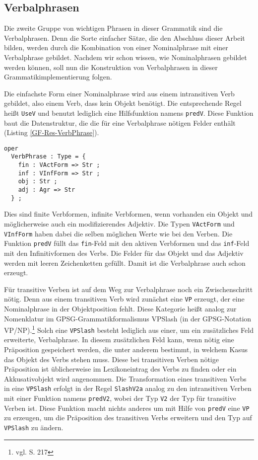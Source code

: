 \subsection{Verbalphrasen}
\label{subsec:verbalphrasen}
Die zweite Gruppe von wichtigen Phrasen in dieser Grammatik sind die Verbalphrasen. Denn die Sorte einfacher Sätze, die den Abschluss dieser Arbeit bilden, werden durch die Kombination von einer Nominalphrase mit einer Verbalphrase gebildet. Nachdem wir schon wissen, wie Nominalphrasen gebildet werden können, soll nun die Konstruktion von Verbalphrasen in dieser Grammatikimplementierung folgen. \par
Die einfachste Form einer Nominalphrase wird aus einem intransitiven Verb gebildet, also einem Verb, dass kein Objekt benötigt. Die entsprechende Regel heißt \texttt{UseV} und benutzt lediglich eine Hilfsfunktion namens \texttt{predV}. Diese Funktion baut die Datenstruktur, die die für eine Verbalphrase nötigen Felder enthält (Listing \ref{GF-Res-VerbPhrase}). 
\begin{lstlisting}[float=h!tp,caption={Datenstruktur für Verbalphrasen (vgl. \textbf{ResLat.gf})},label={GF-Res-VerbPhrase}]
oper
  VerbPhrase : Type = {
    fin : VActForm => Str ;
    inf : VInfForm => Str ;
    obj : Str ;
    adj : Agr => Str
  } ;
\end{lstlisting}
Dies sind finite Verbformen, infinite Verbformen, wenn vorhanden ein Objekt und möglicherweise auch ein modifizierendes Adjektiv. Die Typen \texttt{VActForm} und \texttt{VInfForm} haben dabei die selben möglichen Werte wie bei den Verben. Die Funktion \texttt{predV} füllt das \texttt{fin}-Feld mit den aktiven Verbformen und das \texttt{inf}-Feld mit den Infinitivformen des Verbs. Die Felder für das Objekt und das Adjektiv werden mit leeren Zeichenketten gefüllt. Damit ist die Verbalphrase auch schon erzeugt. \par
Für transitive Verben ist auf dem Weg zur Verbalphrase noch ein Zwischenschritt nötig. Denn aus einem transitiven Verb wird zunächst eine \texttt{VP} erzeugt, der eine Nominalphrase in der Objektposition fehlt. Diese Kategorie heißt analog zur Nomenklatur im GPSG-Grammatikformalismus VPSlash (in der GPSG-Notation VP/NP).\footnote{vgl. \cite{RANTA2011} S. 217} Solch eine \texttt{VPSlash} besteht lediglich aus einer, um ein zusätzliches Feld erweiterte, Verbalphrase. In diesem zusätzlichen Feld kann, wenn nötig eine Präposition gespeichert werden, die unter anderem bestimmt, in welchem Kasus das Objekt des Verbs stehen muss. Diese bei transitiven Verben nötige Präposition ist üblicherweise im Lexikoneintrag des Verbs zu finden oder ein Akkusativobjekt wird angenommen. Die Transformation eines transitiven Verbs in eine \texttt{VPSlash} erfolgt in der Regel \texttt{SlashV2a} analog zu den intransitiven Verben mit einer Funktion namens \texttt{predV2}, wobei der Typ \texttt{V2} der Typ für transitive Verben ist. Diese Funktion macht nichts anderes um mit Hilfe von \texttt{predV} eine \texttt{VP} zu erzeugen, um die Präposition des transitiven Verbs erweitern und den Typ auf \texttt{VPSlash} zu ändern. \par

